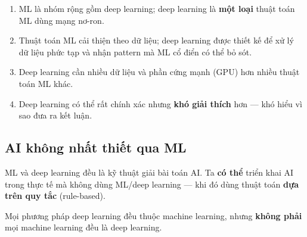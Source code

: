 \begin{ynghia}[title={Bốn điểm}]
\begin{enumerate}
  \item ML là nhóm rộng gồm deep learning; deep learning là \textbf{một loại} thuật toán ML dùng mạng nơ-ron.
  \item Thuật toán ML cải thiện theo dữ liệu; deep learning được thiết kế để xử lý dữ liệu phức tạp và nhận pattern mà ML cổ điển có thể bỏ sót.
  \item Deep learning cần nhiều dữ liệu và phần cứng mạnh (GPU) hơn nhiều thuật toán ML khác.
  \item Deep learning có thể rất chính xác nhưng \textbf{khó giải thích} hơn --- khó hiểu vì sao đưa ra kết luận.
\end{enumerate}
\end{ynghia}

\subsection{AI không nhất thiết qua ML}

\begin{luuy}[title={Triển khai AI bằng quy tắc}]
ML và deep learning đều là kỹ thuật giải bài toán AI.
Ta \textbf{có thể} triển khai AI trong thực tế mà không dùng ML/deep learning --- khi đó dùng thuật toán \textbf{dựa trên quy tắc} (rule-based).
\end{luuy}

\begin{dinhnghia}[title={Quan hệ tập hợp}]
Mọi phương pháp deep learning đều thuộc machine learning, nhưng \textbf{không phải} mọi machine learning đều là deep learning.
\end{dinhnghia}

